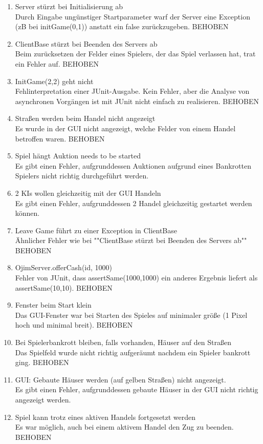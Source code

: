 \documentclass[a4paper,10pt]{article}
\begin{document}
\begin{enumerate}
\item Server stürzt bei Initialisierung ab
\\Durch Eingabe ungünstiger Startparameter warf der Server eine Exception (zB bei initGame(0,1)) anstatt ein false zurückzugeben. BEHOBEN
\item ClientBase stürzt bei Beenden des Servers ab
\\Beim zurücksetzen der Felder eines Spielers, der das Spiel verlassen hat, trat ein Fehler auf. BEHOBEN
\item InitGame(2,2) geht nicht
\\Fehlinterpretation einer JUnit-Ausgabe. Kein Fehler, aber die Analyse von asynchronen Vorgängen ist mit JUnit nicht einfach zu realisieren. BEHOBEN
\item Straßen werden beim Handel nicht angezeigt
\\Es wurde in der GUI nicht angezeigt, welche Felder von einem Handel betroffen waren. BEHOBEN
\item Spiel hängt Auktion needs to be started
\\Es gibt einen Fehler, aufgrunddessen Auktionen aufgrund eines Bankrotten Spielers nicht richtig durchgeführt werden.
\item 2 KIs wollen gleichzeitig mit der GUI Handeln
\\Es gibt einen Fehler, aufgrunddessen 2 Handel gleichzeitig gestartet werden können.
\item Leave Game führt zu einer Exception in ClientBase
\\Ähnlicher Fehler wie bei ""ClientBase stürzt bei Beenden des Servers ab"" BEHOBEN
\item OjimServer.offerCash(id, 1000)
\\Fehler von JUnit, dass assertSame(1000,1000) ein anderes Ergebnis liefert als assertSame(10,10). BEHOBEN
\item Fenster beim Start klein
\\Das GUI-Fenster war bei Starten des Spieles auf minimaler größe (1 Pixel hoch und minimal breit). BEHOBEN
\item Bei Spielerbankrott bleiben, falls vorhanden, Häuser auf den Straßen
\\Das Spielfeld wurde nicht richtig aufgeräumt nachdem ein Spieler bankrott ging. BEHOBEN
\item GUI: Gebaute Häuser werden (auf gelben Straßen) nicht angezeigt.
\\Es gibt einen Fehler, aufgrunddessen gebaute Häuser in der GUI nicht richtig angezeigt werden.
\item Spiel kann trotz eines aktiven Handels fortgesetzt werden
\\Es war möglich, auch bei einem aktivem Handel den Zug zu beenden. BEHOBEN
\end{enumerate}
\end{document}
